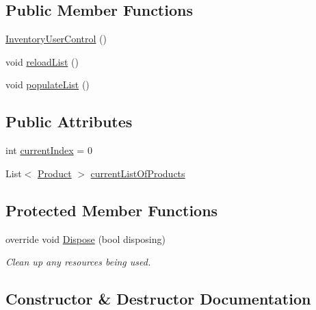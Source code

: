 \subsection*{Public Member Functions}
\begin{DoxyCompactItemize}
\item 
\hyperlink{class_health___assignment_1_1_inventory_user_control_a313d390fa7d4661f550482c9eff3e75e}{Inventory\+User\+Control} ()
\item 
void \hyperlink{class_health___assignment_1_1_inventory_user_control_ac31f5e2ebd442a1bd74d1a3602a73066}{reload\+List} ()
\item 
void \hyperlink{class_health___assignment_1_1_inventory_user_control_ab6211a1078d6fec1434bb0ecf53f4bda}{populate\+List} ()
\end{DoxyCompactItemize}
\subsection*{Public Attributes}
\begin{DoxyCompactItemize}
\item 
int \hyperlink{class_health___assignment_1_1_inventory_user_control_aa2a97626c86ac0abd3a206faa490fb56}{current\+Index} = 0
\item 
List$<$ \hyperlink{class_health___assignment_1_1_product}{Product} $>$ \hyperlink{class_health___assignment_1_1_inventory_user_control_a069631cd36efe9353bc8ccb6269feb3f}{current\+List\+Of\+Products}
\end{DoxyCompactItemize}
\subsection*{Protected Member Functions}
\begin{DoxyCompactItemize}
\item 
override void \hyperlink{class_health___assignment_1_1_inventory_user_control_a2ded5d743af4888ffbe008a0eb1bbd3c}{Dispose} (bool disposing)
\begin{DoxyCompactList}\small\item\em Clean up any resources being used. \end{DoxyCompactList}\end{DoxyCompactItemize}


\subsection{Constructor \& Destructor Documentation}
\mbox{\label{class_health___assignment_1_1_inventory_user_control_a313d390fa7d4661f550482c9eff3e75e}} 
